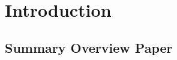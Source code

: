 \documentclass[12pt]%
{article}
\begin{document}
\newpage\thispagestyle{empty}~ %
\newpage 

\begin{abstract}
\end{abstract}

\newpage

\tableofcontents

\newpage

\listoffigures
\listoftables

\newpage

\section{Introduction}

\subsection{Summary Overview Paper}
\end{document}
